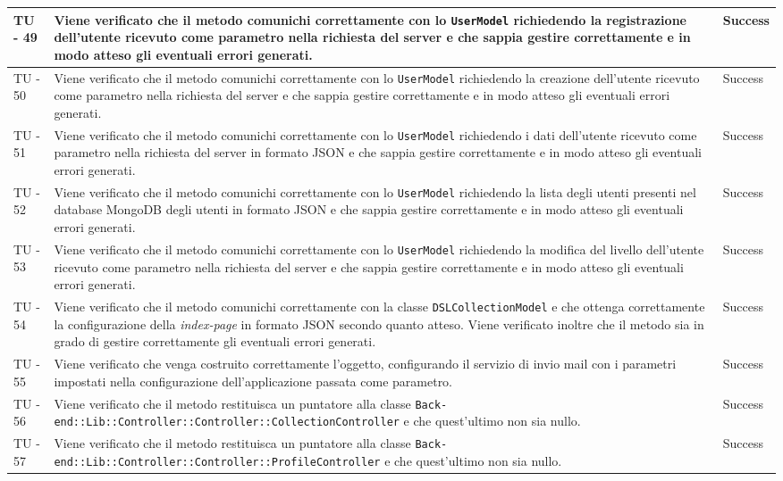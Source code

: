 \begin{center}
\begin{longtable}{ | p{3cm} | p{9cm} | p{2cm} | }
TU - 49 & Viene verificato che il metodo comunichi correttamente con lo \texttt{UserModel} richiedendo la registrazione dell'utente ricevuto come parametro nella richiesta del server e che sappia gestire correttamente e in modo atteso gli eventuali errori generati. & Success \\ \hline
TU - 50 & Viene verificato che il metodo comunichi correttamente con lo \texttt{UserModel} richiedendo la creazione dell'utente ricevuto come parametro nella richiesta del server e che sappia gestire correttamente e in modo atteso gli eventuali errori generati. & Success \\ \hline
TU - 51 & Viene verificato che il metodo comunichi correttamente con lo \texttt{UserModel} richiedendo i dati dell'utente ricevuto come parametro nella richiesta del server in formato JSON e che sappia gestire correttamente e in modo atteso gli eventuali errori generati. & Success \\ \hline
TU - 52 & Viene verificato che il metodo comunichi correttamente con lo \texttt{UserModel} richiedendo la lista degli utenti presenti nel database MongoDB degli utenti in formato JSON e che sappia gestire correttamente e in modo atteso gli eventuali errori generati. & Success \\ \hline
TU - 53 & Viene verificato che il metodo comunichi correttamente con lo \texttt{UserModel} richiedendo la modifica del livello dell'utente ricevuto come parametro nella richiesta del server e che sappia gestire correttamente e in modo atteso gli eventuali errori generati. & Success \\ \hline
TU - 54 & Viene verificato che il metodo comunichi correttamente con la classe \texttt{DSLCollectionModel} e che ottenga correttamente la configurazione della \textit{index-page} in formato JSON secondo quanto atteso. Viene verificato inoltre che il metodo sia in grado di gestire correttamente gli eventuali errori generati. & Success \\ \hline
TU - 55 & Viene verificato che venga costruito correttamente l'oggetto, configurando il servizio di invio mail con i parametri impostati nella configurazione dell'applicazione passata come parametro. & Success \\ \hline
TU - 56 & Viene verificato che il metodo restituisca un puntatore alla classe \texttt{Back-end::Lib::Controller::Controller::CollectionController} e che quest'ultimo non sia nullo. & Success \\ \hline
TU - 57 & Viene verificato che il metodo restituisca un puntatore alla classe \texttt{Back-end::Lib::Controller::Controller::ProfileController} e che quest'ultimo non sia nullo. & Success \\ \hline

\end{longtable}
\end{center}
